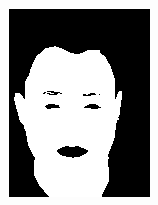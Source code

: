 \begin{figure}[h]
\begin{subfigure}[b]{0.18\textwidth}
         \includegraphics[width=\textwidth]{images/results/base_st/dd110.color.d3_y.png}
     \end{subfigure}
    \hfill
     \begin{subfigure}[b]{0.18\textwidth}
         \centering

\end{subfigure}
\end{figure}
